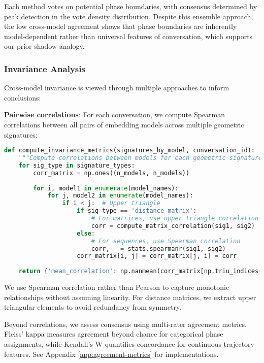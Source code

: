 \documentclass[11pt,letterpaper]{article}
\begin{document}
Each method votes on potential phase boundaries, with consensus determined by peak detection in the vote density distribution. Despite this ensemble approach, the low cross-model agreement shows that phase boundaries are inherently model-dependent rather than universal features of conversation, which supports our prior shadow analogy.

\subsubsection{Invariance Analysis}

Cross-model invariance is viewed through multiple approaches to inform conclusions:

\textbf{Pairwise correlations}: For each conversation, we compute Spearman correlations between all pairs of embedding models across multiple geometric signatures:

\begin{lstlisting}[language=Python]
def compute_invariance_metrics(signatures_by_model, conversation_id):
    """Compute correlations between models for each geometric signature."""
    for sig_type in signature_types:
        corr_matrix = np.ones((n_models, n_models))
        
        for i, model1 in enumerate(model_names):
            for j, model2 in enumerate(model_names):
                if i < j:  # Upper triangle
                    if sig_type == 'distance_matrix':
                        # For matrices, use upper triangle correlation
                        corr = compute_matrix_correlation(sig1, sig2)
                    else:
                        # For sequences, use Spearman correlation
                        corr, _ = stats.spearmanr(sig1, sig2)
                    corr_matrix[i, j] = corr_matrix[j, i] = corr
    
    return {'mean_correlation': np.nanmean(corr_matrix[np.triu_indices(n_models, k=1)])}
\end{lstlisting}

We use Spearman correlation rather than Pearson to capture monotonic relationships without assuming linearity. For distance matrices, we extract upper triangular elements to avoid redundancy from symmetry.

Beyond correlations, we assess consensus using multi-rater agreement metrics. Fleiss' kappa measures agreement beyond chance for categorical phase assignments, while Kendall's W quantifies concordance for continuous trajectory features. See Appendix \ref{app:agreement-metrics} for implementations.
\end{document}
